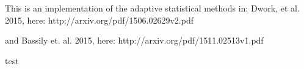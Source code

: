 This is an implementation of the adaptive statistical methods in:
 Dwork, et al. 2015, here: http://arxiv.org/pdf/1506.02629v2.pdf

and Bassily et. al. 2015, here: http://arxiv.org/pdf/1511.02513v1.pdf

test
